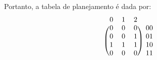 \documentclass[12pt]{article}
\begin{document}
Portanto, a tabela de planejamento é dada por:
\[
\begin{blockarray}{cccc}
0 & 1 & 2 \\
\begin{block}{(ccc)c}
  0 & 0 & 0 & 00 \\
  0 & 0 & 1 & 01 \\
  1 & 1 & 1 & 10 \\
  0 & 0 & 0 & 11 \\
\end{block}
\end{blockarray}
\]
\end{document}
